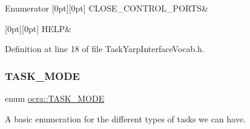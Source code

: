 \begin{DoxyEnumFields}{Enumerator}
[0pt][0pt]{}\hypertarget{namespaceocra_ae51761f3980546f5ee4cbc6ebe4216ddade9cd90476b62974254b4f257e99f89d}{}\label{namespaceocra_ae51761f3980546f5ee4cbc6ebe4216ddade9cd90476b62974254b4f257e99f89d} 
C\+L\+O\+S\+E\+\_\+\+C\+O\+N\+T\+R\+O\+L\+\_\+\+P\+O\+R\+TS&\\
\hline

[0pt][0pt]{}\hypertarget{namespaceocra_ae51761f3980546f5ee4cbc6ebe4216dda2c0c3df383085258b258cf99f0035aef}{}\label{namespaceocra_ae51761f3980546f5ee4cbc6ebe4216dda2c0c3df383085258b258cf99f0035aef} 
H\+E\+LP&\\
\hline

\end{DoxyEnumFields}


Definition at line 18 of file Task\+Yarp\+Interface\+Vocab.\+h.

\hypertarget{namespaceocra_a2ed783528071ed7ee7a57d923637595f}{}\label{namespaceocra_a2ed783528071ed7ee7a57d923637595f} 
\subsubsection{\texorpdfstring{T\+A\+S\+K\+\_\+\+M\+O\+DE}{TASK\_MODE}}
{\footnotesize\ttfamily enum \hyperlink{namespaceocra_a2ed783528071ed7ee7a57d923637595f}{ocra\+::\+T\+A\+S\+K\+\_\+\+M\+O\+DE}}



A basic enumeration for the different types of tasks we can have. 

